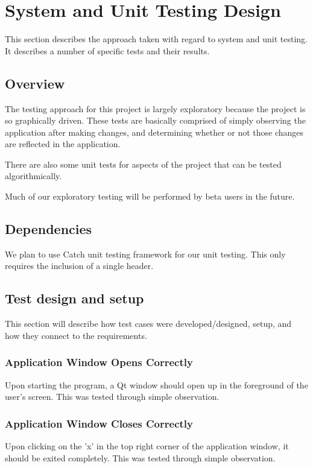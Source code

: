 

\chapter{System and Unit Testing Design}
This section describes the approach taken with regard to system and unit testing. It describes a number of specific tests and their results.  

\section{Overview}
The testing approach for this project is largely exploratory because the project is so graphically driven. These tests are basically comprised of simply observing the application after making changes, and determining whether or not those changes are reflected in the application.

There are also some unit tests for aspects of the project that can be tested algorithmically.

Much of our exploratory testing will be performed by beta users in the future.

\section{Dependencies}
We plan to use Catch unit testing framework for our unit testing. This only requires the inclusion of a single header.


\section{Test design and setup}
This section will describe how test cases were developed/designed, setup, and how they connect to the requirements.

\subsection{Application Window Opens Correctly}
Upon starting the program, a Qt window should open up in the foreground of the user's screen. This was tested through simple observation.

\subsection{Application Window Closes Correctly}
Upon clicking on the 'x' in the top right corner of the application window, it should be exited completely. This was tested through simple observation.

